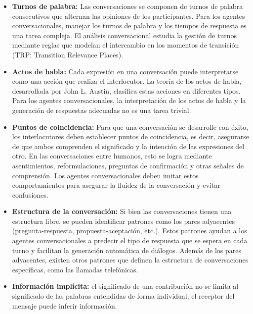 \documentclass{report}
\begin{document}
\begin{itemize}
    \item \textbf{Turnos de palabra:} Las conversaciones se componen de turnos de palabra consecutivos que alternan las opiniones de los participantes. Para los agentes conversacionales, manejar los turnos de palabra y los tiempos de respuesta es una tarea compleja. El análisis conversacional estudia la gestión de turnos mediante reglas que modelan el intercambio en los momentos de transición (TRP: Transition Relevance Places).
    \item \textbf{Actos de habla:} Cada expresión en una conversación puede interpretarse como una acción que realiza el interlocutor. La teoría de los actos de habla, desarrollada por John L. Austin, clasifica estas acciones en diferentes tipos. Para los agentes conversacionales, la interpretación de los actos de habla y la generación de respuestas adecuadas no es una tarea trivial.
    \item \textbf{Puntos de coincidencia:} Para que una conversación se desarrolle con éxito, los interlocutores deben establecer puntos de coincidencia, es decir, asegurarse de que ambos comprenden el significado y la intención de las expresiones del otro. En las conversaciones entre humanos, esto se logra mediante asentimientos, reformulaciones, preguntas de confirmación y otras señales de comprensión. Los agentes conversacionales deben imitar estos comportamientos para asegurar la fluidez de la conversación y evitar confusiones.
    
    \item \textbf{Estructura de la conversación:} Si bien las conversaciones tienen una estructura libre, se pueden identificar patrones como los pares adyacentes (pregunta-respuesta, propuesta-aceptación, etc.). Estos patrones ayudan a los agentes conversacionales a predecir el tipo de respuesta que se espera en cada turno y facilitan la generación automática de diálogos. Además de los pares adyacentes, existen otros patrones que definen la estructura de conversaciones específicas, como las llamadas telefónicas.
    
    \item \textbf{Información implícita:}  el significado de una contribución no se limita al significado de las palabras entendidas de forma individual; el receptor del mensaje puede inferir información.
\end{itemize}
\end{document}
